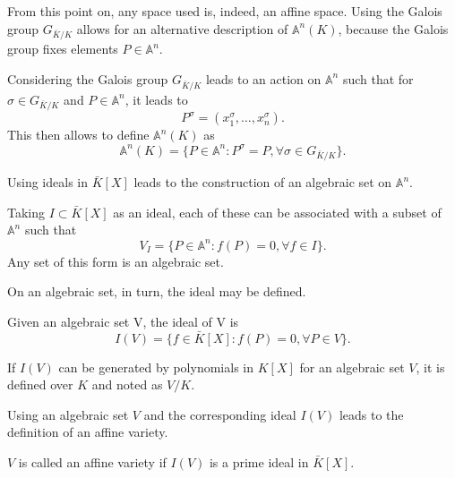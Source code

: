 From this point on, any space used is, indeed, an affine space. Using the Galois group $G_{\bar{K}/K}$ allows for an alternative description of $\mathbb{A}^n(K)$, because the Galois group fixes elements $P\in\mathbb{A}^n$.
\begin{rem}
	Considering the Galois group $G_{\bar{K}/K}$ leads to an action on $\mathbb{A}^n$ such that for $\sigma\in G_{\bar{K}/K}$ and $P\in\mathbb{A}^n$, it leads to
	\begin{equation*}
	P^\sigma=(x_1^\sigma,\dots,x_n^\sigma).
	\end{equation*}
	This then allows to define $\mathbb{A}^n(K)$ as
	\begin{equation*}
	\mathbb{A}^n(K)=\{P\in\mathbb{A}^n:P^\sigma=P,\forall\sigma\in G_{\bar{K}/K}\}.
	\end{equation*}
\end{rem}

Using ideals in $\bar{K}[X]$ leads to the construction of an algebraic set on $\mathbb{A}^n$.
\begin{defn}
	Taking $I\subset\bar{K}[X]$ as an ideal, each of these can be associated with a subset of $\mathbb{A}^n$ such that
	\begin{equation*}
	V_I=\{P\in\mathbb{A}^n:f(P)=0,\forall f\in I\}.
	\end{equation*}
	Any set of this form is an algebraic set.
\end{defn}

On an algebraic set, in turn, the ideal may be defined.
\begin{defn}
	Given an algebraic set V, the ideal of V is
	\begin{equation*}
	I(V)=\{f\in\bar{K}[X]:f(P)=0,\forall P\in V\}.
	\end{equation*}	
\end{defn}
If $I(V)$ can be generated by polynomials in $K[X]$ for an algebraic set $V$, it is defined over $K$ and noted as $V/K$.

Using an algebraic set $V$ and the corresponding ideal $I(V)$ leads to the definition of an affine variety.
\begin{defn}
	$V$ is called an affine variety if $I(V)$ is a prime ideal in $\bar{K}[X]$.
\end{defn}

